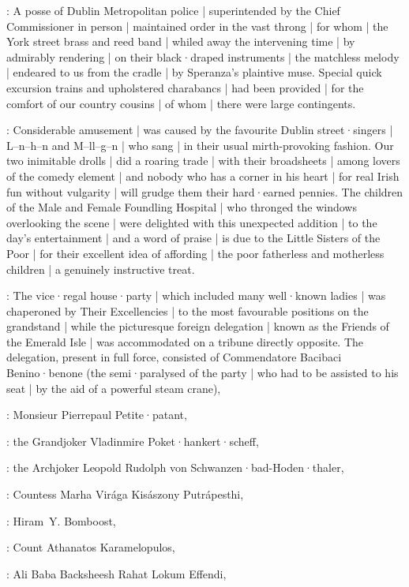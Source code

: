:
A posse of Dublin Metropolitan police |
superintended by the Chief Commissioner in person |
maintained order in the vast throng |
for whom |
the York street brass and reed band |
whiled away the intervening time |
by admirably rendering |
on their black·draped instruments |
the matchless melody |
endeared to us from the cradle |
by Speranza's plaintive muse.
Special quick excursion trains and upholstered charabancs |
had been provided
 |
for the comfort of our country cousins |
of whom |
there were large contingents.

:
Considerable amusement |
was caused by the favourite Dublin street·singers |
L–n–h–n and M–ll–g–n |
who sang  |
in their usual mirth-provoking fashion.
Our two inimitable drolls |
did a roaring trade |
with their broadsheets |
among lovers of the comedy element |
and nobody who has a corner in his heart |
for real Irish fun without vulgarity |
will grudge them their hard·earned pennies.
The children of the Male and Female Foundling Hospital |
who thronged the windows overlooking the scene |
were delighted with this unexpected addition |
to the day's entertainment |
and a word of praise |
is due to the Little Sisters of the Poor
 |
for their excellent idea of affording |
the poor fatherless and motherless children |
a genuinely instructive treat.

:
The vice·regal house·party |
which included many well·known ladies |
was chaperoned by Their Excellencies |
to the most favourable positions on the grandstand |
while the picturesque foreign delegation |
known as the Friends of the Emerald Isle |
was accommodated on a tribune directly opposite.
The delegation,
present in full force,
consisted of Commendatore Bacibaci Benino·benone
(the semi·paralysed  of the party |
who had to be assisted to his seat |
by the aid of a powerful steam crane),

:
Monsieur Pierrepaul Petite·patant,

:
the Grandjoker Vladinmire Poket·hankert·scheff,

:
the Archjoker Leopold Rudolph von Schwanzen·bad-Hoden·thaler,

:
Countess Marha Virága Kisászony Putrápesthi,

:
Hiram~Y. Bomboost,

:
Count Athanatos Karamelopulos,

:
Ali Baba Backsheesh Rahat Lokum Effendi,

